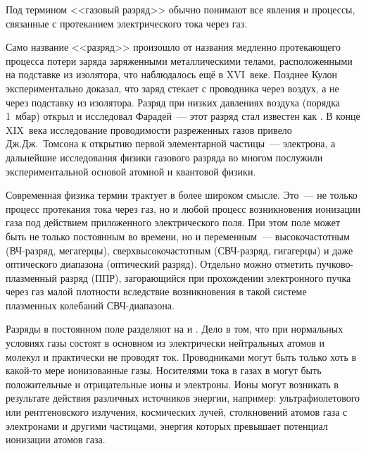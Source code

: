 
\begingroup
\small

\label{sec:discharge}

Под термином <<газовый разряд>> обычно понимают все явления и процессы,
связанные с протеканием электрического тока через газ.

Само название <<разряд>> произошло от названия медленно протекающего
процесса потери заряда заряженными металлическими телами,
расположенными на подставке из изолятора, что наблюдалось ещё в
XVI~веке. Позднее Кулон экспериментально доказал, что заряд стекает
с проводника через воздух, а не через подставку из изолятора.
Разряд при низких давлениях воздуха (порядка 1~мбар) открыл и исследовал
Фарадей~--- этот разряд стал известен как . В конце XIX~века
исследование проводимости разреженных газов привело Дж.Дж.~Томсона к
открытию первой элементарной частицы~--- электрона, а дальнейшие исследования
физики газового разряда во многом послужили экспериментальной основой
атомной и квантовой физики.


Современная физика термин  трактует в более широком
смысле. Это~--- не только процесс протекания тока через газ, но и любой процесс
возникновения ионизации газа под действием приложенного электрического поля.
При этом поле может быть не только постоянным во времени,
но и переменным~--- высокочастотным (ВЧ-разряд, мегагерцы),
сверхвысокочастотным (СВЧ-разряд, гигагерцы) и даже оптического диапазона
(оптический разряд). Отдельно можно отметить пучково-плазменный разряд (ППР),
загорающийся при прохождении электронного пучка через газ малой плотности
вследствие возникновения в такой системе плазменных колебаний СВЧ-диапазона.

Разряды в постоянном поле разделяют на  и
. Дело в том, что при нормальных
условиях газы состоят в основном из электрически нейтральных атомов и
молекул и практически не проводят ток.
Проводниками могут быть только хоть в какой-то мере ионизованные газы.
Носителями тока в газах в могут быть положительные и отрицательные ионы и электроны.
Ионы могут возникать в результате действия различных
источников энергии, например: ультрафиолетового или рентгеновского излучения,
космических лучей, столкновений атомов газа с электронами и другими частицами, энергия
которых превышает потенциал ионизации атомов газа.

